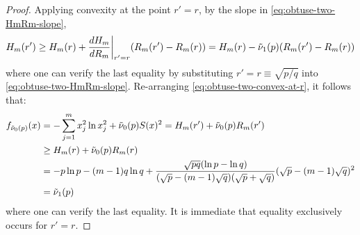 \documentclass[11pt]{article}
\begin{document}
\begin{proof}
    Applying convexity at the point $r'=r$, by the slope in \eqref{eq:obtuse-two-HmRm-slope}, 
    \begin{equation}\label{eq:obtuse-two-convex-at-r}
        H_m(r')\geq H_m(r)+\frac{dH_m}{d R_m}\bigg|_{r'=r}(R_m(r')-R_m(r))=H_m(r)-\Tilde \nu_1(p)(R_m(r')-R_m(r))
    \end{equation}
    where one can verify the last equality by substituting $r'=r\equiv \sqrt{p/q}$ into \eqref{eq:obtuse-two-HmRm-slope}. Re-arranging \eqref{eq:obtuse-two-convex-at-r}, it follows that:
    \begin{equation}\label{eq:obtuse-two-convex-bound}
    \begin{aligned}
        f_{{\Tilde \nu_0}(p)}(x)&=-\sum_{j=1}^mx_j^2\ln x_j^2 +{\Tilde \nu_0}(p)S(x)^2=H_m(r')+{\Tilde \nu_0}(p)R_m(r')\\
        &\geq H_m(r)+{\Tilde \nu_0}(p)R_m(r)\\
        &=-p\ln p -(m-1)q\ln q +\frac{\sqrt{pq}(\ln p-\ln q)}{(\sqrt p-(m-1)\sqrt q)(\sqrt p+\sqrt q)}(\sqrt p-(m-1)\sqrt q)^2\\
        &={\Tilde \nu_1}(p)
    \end{aligned}
    \end{equation}
    where one can verify the last equality. It is immediate that equality exclusively occurs for $r'=r$. 
\end{proof}
\end{document}
